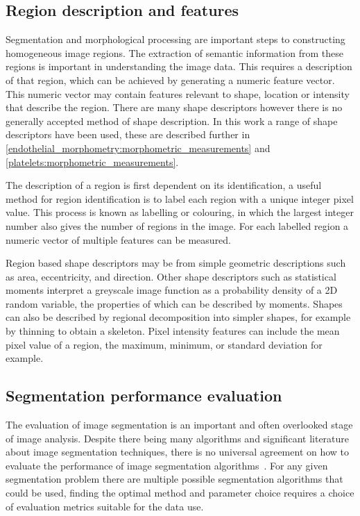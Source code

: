 \subsection{Region description and features}
\label{introduction:image_processing:morphological_processing}
Segmentation and morphological processing are important steps to constructing homogeneous image regions. The extraction of semantic information from these regions is important in understanding the image data. This requires a description of that region, which can be achieved by generating a numeric feature vector. This numeric vector may contain features relevant to shape, location or intensity that describe the region. There are many shape descriptors however there is no generally accepted method of shape description. In this work a range of shape descriptors have been used, these are described further in \autoref{endothelial_morphometry:morphometric_measurements} and \autoref{platelets:morphometric_measurements}.

The description of a region is first dependent on its identification, a useful method for region identification is to label each region with a unique integer pixel value. This process is known as labelling or colouring, in which the largest integer number also gives the number of regions in the image. For each labelled region a numeric vector of multiple features can be measured.

Region based shape descriptors may be from simple geometric descriptions such as area, eccentricity, and direction. Other shape descriptors such as statistical moments interpret a greyscale image function as a probability density of a 2D random variable, the properties of which can be described by moments. Shapes can also be described by regional decomposition into simpler shapes, for example by thinning to obtain a skeleton. Pixel intensity features can include the mean pixel value of a region, the maximum, minimum, or standard deviation for example.

\subsection{Segmentation performance evaluation}
\label{introduction:image_processing:performance_evaluation}
The evaluation of image segmentation is an important and often overlooked stage of image analysis. Despite there being many algorithms and significant literature about image segmentation techniques, there is no universal agreement on how to evaluate the performance of image segmentation algorithms~\cite{Benes2015}. For any given segmentation problem there are multiple possible segmentation algorithms that could be used, finding the optimal method and parameter choice requires a choice of evaluation metrics suitable for the data use.

